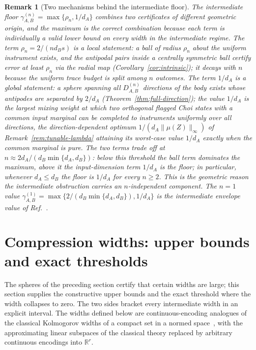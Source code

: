 \documentclass[11pt,a4paper]{article}
\newtheorem{remark}[theorem]{Remark}
\begin{document}
\begin{remark}[Two mechanisms behind the intermediate floor]
\label{rem:gamma-mechanisms}
The intermediate floor $\gamma_{A,B}^{(n)}=\max\{\rho_n,1/d_A\}$ combines two certificates of different geometric origin, and the maximum is the correct combination because each term is individually a valid lower bound on every width in the intermediate regime. The term $\rho_n=2/(nd_Bs)$ is a local statement: a ball of radius $\rho_n$ about the uniform instrument exists, and the antipodal pairs inside a centrally symmetric ball certify error at least $\rho_n$ via the radial map (Corollary~\ref{cor:intrinsic}); it decays with $n$ because the uniform trace budget is split among $n$ outcomes. The term $1/d_A$ is a global statement: a sphere spanning all $D_{A,B}^{(n)}$ directions of the body exists whose antipodes are separated by $2/d_A$ (Theorem~\ref{thm:full-direction}); the value $1/d_A$ is the largest mixing weight at which two orthogonal flagged Choi states with a common input marginal can be completed to instruments uniformly over all directions, the direction-dependent optimum $1/(d_A\|\mu(Z)\|_\infty)$ of Remark~\ref{rem:tunable-lambda} attaining its worst-case value $1/d_A$ exactly when the common marginal is pure. The two terms trade off at $n\approx2d_A/(d_B\min\{d_A,d_B\})$: below this threshold the ball term dominates the maximum, above it the input-dimension term $1/d_A$ is the floor; in particular, whenever $d_A\le d_B$ the floor is $1/d_A$ for every $n\ge2$. This is the geometric reason the intermediate obstruction carries an $n$-independent component. The $n=1$ value $\gamma_{A,B}^{(1)}=\max\{2/(d_B\min\{d_A,d_B\}),1/d_A\}$ is the intermediate envelope value of Ref.~\cite{CompanionChannels}.
\end{remark}

\section{Compression widths: upper bounds and exact thresholds}
\label{sec:widths}

The spheres of the preceding section certify that certain widths are large; this section supplies the constructive upper bounds and the exact threshold where the width collapses to zero. The two sides bracket every intermediate width in an explicit interval. The widths defined below are continuous-encoding analogues of the classical Kolmogorov widths of a compact set in a normed space~\cite{Pinkus1985}, with the approximating linear subspaces of the classical theory replaced by arbitrary continuous encodings into $\mathbb R^r$.
\end{document}
